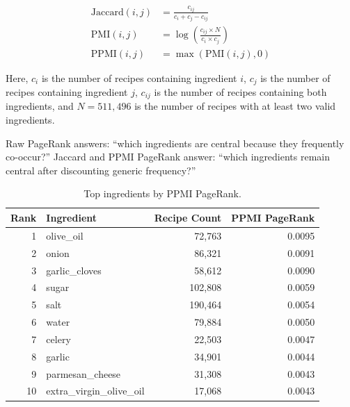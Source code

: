 \documentclass[11pt,a4paper]{article}
\begin{document}
\begin{align*}
\text{Jaccard}(i,j) &= \frac{c_{ij}}{c_i + c_j - c_{ij}} \\[0.8em]
\text{PMI}(i,j) &= \log\left(\frac{c_{ij} \times N}{c_i \times c_j}\right) \\[0.8em]
\text{PPMI}(i,j) &= \max(\text{PMI}(i,j), 0)
\end{align*}

Here, $c_i$ is the number of recipes containing ingredient $i$, $c_j$ is the number of recipes containing ingredient $j$, $c_{ij}$ is the number of recipes containing both ingredients, and $N=511{,}496$ is the number of recipes with at least two valid ingredients.

Raw PageRank answers: ``which ingredients are central because they frequently co-occur?'' Jaccard and PPMI PageRank answer: ``which ingredients remain central after discounting generic frequency?''

\begin{table}[H]
\centering
\small
\begin{tabular}{rlrr}
\toprule
\textbf{Rank} & \textbf{Ingredient} & \textbf{Recipe Count} & \textbf{PPMI PageRank} \\
\midrule
1 & olive\_oil & 72,763 & 0.0095 \\
2 & onion & 86,321 & 0.0091 \\
3 & garlic\_cloves & 58,612 & 0.0090 \\
4 & sugar & 102,808 & 0.0059 \\
5 & salt & 190,464 & 0.0054 \\
6 & water & 79,884 & 0.0050 \\
7 & celery & 22,503 & 0.0047 \\
8 & garlic & 34,901 & 0.0044 \\
9 & parmesan\_cheese & 31,308 & 0.0043 \\
10 & extra\_virgin\_olive\_oil & 17,068 & 0.0043 \\
\bottomrule
\end{tabular}
\caption{Top ingredients by PPMI PageRank.}
\label{tab:top_ppmi_pagerank_graph}
\end{table}
\end{document}
